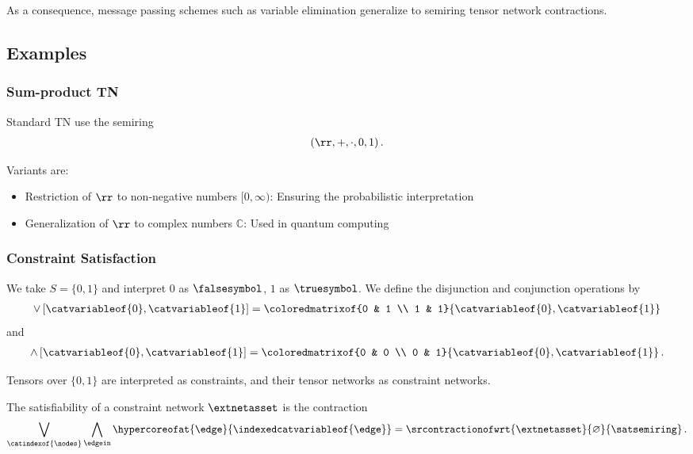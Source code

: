 As a consequence, message passing schemes such as variable elimination generalize to semiring tensor network contractions.

\subsection{Examples}

\subsubsection{Sum-product TN}\label{sec:complexSPContraction}

Standard TN use the semiring
\begin{align*}
(\rr,+,\cdot,0,1)
    \, .
\end{align*}


Variants are:
\begin{itemize}
    \item Restriction of $\rr$ to non-negative numbers $[0,\infty)$: Ensuring the probabilistic interpretation
    \item Generalization of $\rr$ to complex numbers $\mathbb{C}$: Used in quantum computing
\end{itemize}

\subsubsection{Constraint Satisfaction}

We take $S=\{0,1\}$ and interpret $0$ as $\falsesymbol$, $1$ as $\truesymbol$.
We define the disjunction and conjunction operations by
\begin{align*}
    \lor \left[\catvariableof{0},\catvariableof{1}\right]
    = \coloredmatrixof{0 & 1 \\ 1 & 1}{\catvariableof{0},\catvariableof{1}}
\end{align*}
and
\begin{align*}
    \land \left[\catvariableof{0},\catvariableof{1}\right]
    = \coloredmatrixof{0 & 0 \\ 0 & 1}{\catvariableof{0},\catvariableof{1}} \, .
\end{align*}

Tensors over $\{0,1\}$ are interpreted as constraints, and their tensor networks as constraint networks.

The satisfiability of a constraint network $\extnetasset$ is the contraction
\begin{align*}
    \bigvee_{\catindexof{\nodes}} \bigwedge_{\edgein} \hypercoreofat{\edge}{\indexedcatvariableof{\edge}}
    = \srcontractionofwrt{
        \extnetasset
    }{\varnothing}{\satsemiring} \, .
\end{align*}

